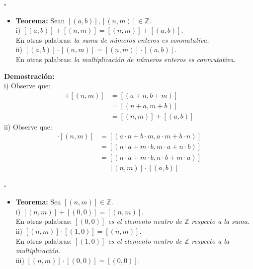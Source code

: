 \documentclass[10 pt]{article}
\begin{document}
\begin{flushright}
    $\square$
\end{flushright}

\begin{itemize}
    \item \Large{\textbf{Teorema:} Sean $[(a,b)],[(n,m)] \in \mathbb Z$. \\

    i) $[(a,b)]+[(n,m)]=[(n,m)]+[(a,b)]$. \\

    En otras palabras: \textit{la suma de números enteros es conmutativa.} \\

    ii) $[(a,b)] \cdot [(n,m)]=[(n,m)] \cdot [(a,b)]$. \\

    En otras palabras: \textit{la multiplicación de números enteros es conmutativa}.} \\
\end{itemize}

\Large{\textbf{Demostración:} \\

i) Observe que:} 
\begin{align*}
    [(a,b)]+[(n,m)]&=[(a+n,b+m)] \\
    &=[(n+a,m+b)] \\
    &=[(n,m)]+[(a,b)]
\end{align*}
\Large{ii) Observe que:}
\begin{align*}
    [(a,b)] \cdot [(n,m)]&=[(a \cdot n+b \cdot m,a \cdot m+b \cdot n)] \\
    &=[(n \cdot a+m \cdot b,m \cdot a+n \cdot b)] \\
    &=[(n \cdot a+m \cdot b,n \cdot b+m \cdot a)] \\
    &=[(n,m)] \cdot [(a,b)]
\end{align*}

\begin{flushright}
$\square$
\end{flushright}

\begin{itemize}
    \item \Large{\textbf{Teorema:} Sea $[(n,m)] \in \mathbb Z$. \\

    i) $[(n,m)]+[(0,0)]=[(n,m)]$. \\

    En otras palabras: \textit{$[(0,0)]$ es el elemento neutro de $\mathbb Z$ respecto a la suma}. \\

    ii) $[(n,m)] \cdot [(1,0)]=[(n,m)]$. \\

    En otras palabras: \textit{$[(1,0)]$ es el elemento neutro de $\mathbb Z$ respecto a la multiplicación}. \\

    iii) $[(n,m)] \cdot [(0,0)]=[(0,0)]$.} \\
\end{itemize}
\end{document}
